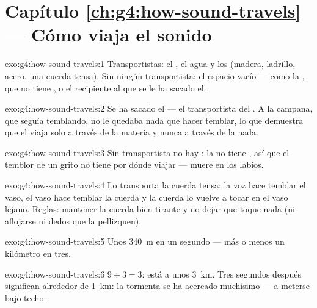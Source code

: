 \section*{Capítulo \ref{ch:g4:how-sound-travels} --- Cómo viaja el sonido}

\begin{solution}{exo:g4:how-sound-travels:1}
Transportistas: el , el agua y los  (madera, ladrillo,
acero, una cuerda tensa). Sin ningún transportista: el espacio vacío
--- como la , que no tiene , o el recipiente al que se le ha
sacado el .
\end{solution}

\begin{solution}{exo:g4:how-sound-travels:2}
Se ha sacado el  --- el transportista del . A la campana,
que seguía temblando, no le quedaba nada que hacer temblar, lo que
demuestra que el  viaja solo a través de la materia y nunca a
través de la nada.
\end{solution}

\begin{solution}{exo:g4:how-sound-travels:3}
Sin transportista no hay : la  no tiene , así que
el temblor de un grito no tiene por dónde viajar --- muere en los
labios.
\end{solution}

\begin{solution}{exo:g4:how-sound-travels:4}
Lo transporta la cuerda tensa: la voz hace temblar el vaso, el vaso
hace temblar la cuerda y la cuerda lo vuelve a tocar en el vaso
lejano. Reglas: mantener la cuerda bien tirante y no dejar que toque
nada (ni aflojarse ni dedos que la pellizquen).
\end{solution}

\begin{solution}{exo:g4:how-sound-travels:5}
Unos \qty{340}{m} en un segundo --- más o menos un kilómetro en tres.
\end{solution}

\begin{solution}{exo:g4:how-sound-travels:6}
$9 \div 3 = 3$: está a unos \qty{3}{km}. Tres segundos después
significan alrededor de \qty{1}{km}: la tormenta se ha acercado
muchísimo --- a meterse bajo techo.
\end{solution}

